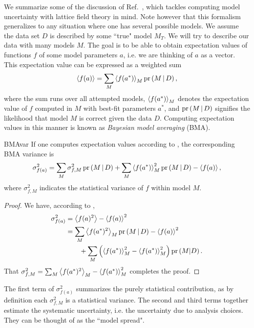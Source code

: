 We summarize some of the discussion of Ref.~\cite{neil_improved_2024},
which tackles computing
model uncertainty with lattice field theory in mind. Note however that this
formalism generalizes to any situation where one has several possible models. 
We assume the data set $D$ is described by some ``true" model $M_T$.
We will try to describe our data with many models $M$.
The goal is to be able to obtain expectation values of functions $f$
of some model parameters $a$, i.e. we are thinking of $a$ as a vector.
This expectation value can be expressed as a weighted sum 
\begin{equation}\label{eq:BMAmean}
\ev{f(a)}=
\sum_M \ev{f(a^*)}_M \pr{M\given D},
\end{equation} 
where the sum runs over all attempted models, 
$\ev{f(a^*)}_M$ denotes the expectation value of $f$ computed in $M$ with best-fit
parameters $a^*$, and $\operatorname{pr}\left(M\,|\, D\right)$ signifies the likelihood that model $M$ 
is correct given the data $D$. Computing expectation values in this manner
is known as {\it Bayesian model averaging} (BMA).


\begin{theorem}{}{BMAvar}
If one computes expectation values according to ,
the corresponding BMA variance is
$$
\sigma^2_{f(a)}=
\sum_M\sigma^2_{f,M}\pr{M\given D}
+\sum_M\ev{f(a^*)}_M^2\pr{M\given D}
-\ev{f(a)},
$$
where $\sigma^2_{f,M}$ indicates the statistical variance of $f$
within model $M$.
\begin{proof}
We have, according to ,
\begin{equation}\begin{aligned}
\sigma^2_{f(a)} &= \ev{f(a)^2}-\ev{f(a)}^2\\
&= \sum_M\ev{f(a^*)^2}_M\pr{M\given D}
-\ev{f(a)}^2\\
&~~~~~~+\sum_M\left(\ev{f(a^*)}_M^2-\ev{f(a^*)}_M^2
\right)\pr{M|D}.
\end{aligned}\end{equation}
That 
$\sigma^2_{f,M}=\sum_M\ev{f(a^*)^2}_M-\ev{f(a^*)}_M^2$
completes the proof.
\end{proof}
\end{theorem}

The first term of $\sigma^2_{f(a)}$ summarizes the purely statistical
contribution, as by definition each $\sigma^2_{f,M}$ is a statistical variance.
The second and third terms together estimate the systematic uncertainty, i.e.
the uncertainty due to analysis choices. 
They can be thought of as the ``model spread".



